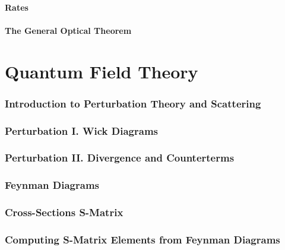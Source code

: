 \documentclass[12pt]{article}
\numberwithin{equation}{section}
\begin{document}
\subsection{Rates}
\subsection{The General Optical Theorem}
\part{Quantum Field Theory}
\section{Introduction to Perturbation Theory and Scattering} 
\section{Perturbation I. Wick Diagrams}
\section{Perturbation II. Divergence and Counterterms}
\section{Feynman Diagrams}
\section{Cross-Sections S-Matrix}
\section{Computing S-Matrix Elements from Feynman Diagrams}
\end{document}

